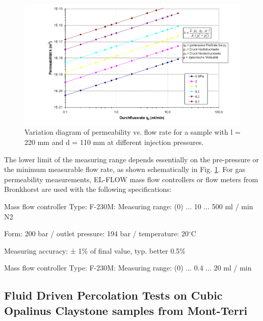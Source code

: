 \begin{figure}[!ht]
\centering
\includegraphics[width=1\textwidth]{./figures/ifg-perme-flowrate.png}
\caption{Variation diagram of permeability vs. flow rate for a sample with l = 220 mm and d = 110 mm at different injection pressures.}
\label{fig:ifgpermeflow}
\end{figure}

The lower limit of the measuring range depends essentially on the pre-pressure or the minimum measurable flow rate, as shown schematically in Fig. \ref{fig:ifgpermeflow}.
%
For gas permeability measurements, EL-FLOW mass flow controllers or flow meters from Bronkhorst are used with the following specifications:

\begin{list}{-}{\leftmargin=1em \itemindent=0em \itemsep=0em}
\item Mass flow controller Type: F-230M: Measuring range: (0) ... 10 ... 500 ml / min N2
\item Form: 200 bar / outlet pressure: 194 bar / temperature: 20$^\circ$C
\item Measuring accuracy: ± 1\% of final value, typ. better 0.5\%
\item Mass flow controller Type: F-230M: Measuring range: (0) ... 0.4 ... 20 ml / min
\end{list}


\subsection{Fluid Driven Percolation Tests on Cubic Opalinus Claystone samples from Mont-Terri}
\label{sec:Percolation_Claystone_Exp}

